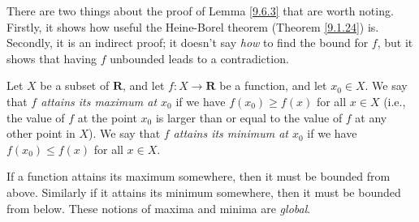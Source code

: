 \begin{remark}\label{9.6.4}
    There are two things about the proof of Lemma \ref{9.6.3} that are worth noting.
    Firstly, it shows how useful the Heine-Borel theorem (Theorem \ref{9.1.24}) is.
    Secondly, it is an indirect proof;
    it doesn't say \emph{how} to find the bound for \(f\), but it shows that having \(f\) unbounded leads to a contradiction.
\end{remark}

\begin{definition}\label{9.6.5}
    Let \(X\) be a subset of \(\mathbf{R}\), and let \(f : X \to \mathbf{R}\) be a function, and let \(x_0 \in X\).
    We say that \emph{\(f\) attains its maximum at \(x_0\)} if we have \(f(x_0) \geq f(x)\) for all \(x \in X\)
    (i.e., the value of \(f\) at the point \(x_0\) is larger than or equal to the value of \(f\) at any other point in \(X\)).
    We say that \emph{\(f\) attains its minimum at \(x_0\)} if we have \(f(x_0) \leq f(x)\) for all \(x \in X\).
\end{definition}

\begin{remark}\label{9.6.6}
    If a function attains its maximum somewhere, then it must be bounded from above.
    Similarly if it attains its minimum somewhere, then it must be bounded from below.
    These notions of maxima and minima are \emph{global}.
\end{remark}